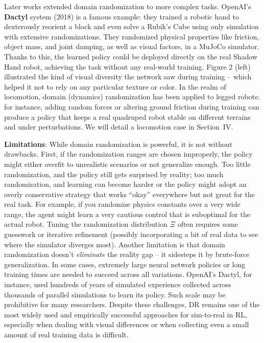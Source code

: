 Later works extended domain randomization to more complex tasks. OpenAI’s \textbf{Dactyl} system (2018) is a famous example: they trained a robotic hand to dexterously reorient a block and even solve a Rubik’s Cube using only simulation with extensive randomizations. They randomized physical properties like friction, object mass, and joint damping, as well as visual factors, in a MuJoCo simulator. Thanks to this, the learned policy could be deployed directly on the real Shadow Hand robot, achieving the task without any real-world training. Figure 2 (left) illustrated the kind of visual diversity the network saw during training – which helped it not to rely on any particular texture or color. In the realm of locomotion, domain (dynamics) randomization has been applied to legged robots: for instance, adding random forces or altering ground friction during training can produce a policy that keeps a real quadruped robot stable on different terrains and under perturbations. We will detail a locomotion case in Section IV.

\textbf{Limitations}: While domain randomization is powerful, it is not without drawbacks. First, if the randomization ranges are chosen improperly, the policy might either overfit to unrealistic scenarios or not generalize enough. Too little randomization, and the policy still gets surprised by reality; too much randomization, and learning can become harder or the policy might adopt an overly conservative strategy that works “okay” everywhere but not great for the real task. For example, if you randomize physics constants over a very wide range, the agent might learn a very cautious control that is suboptimal for the actual robot. Tuning the randomization distribution $\Xi$ often requires some guesswork or iterative refinement (possibly incorporating a bit of real data to see where the simulator diverges most). Another limitation is that domain randomization doesn’t \textit{eliminate} the reality gap – it sidesteps it by brute-force generalization. In some cases, extremely large neural network policies or long training times are needed to succeed across all variations. OpenAI’s Dactyl, for instance, used hundreds of years of simulated experience collected across thousands of parallel simulations to learn its policy. Such scale may be prohibitive for many researchers. Despite these challenges, DR remains one of the most widely used and empirically successful approaches for sim-to-real in RL, especially when dealing with visual differences or when collecting even a small amount of real training data is difficult.

